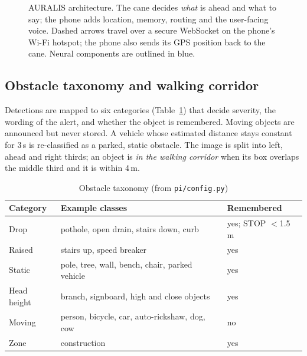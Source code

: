 \documentclass[conference]{IEEEtran}
\begin{document}
\begin{figure}[t]
\caption{AURALIS architecture. The cane decides \emph{what} is ahead and what to say; the phone adds location, memory, routing and the user-facing voice. Dashed arrows travel over a secure WebSocket on the phone's Wi-Fi hotspot; the phone also sends its GPS position back to the cane. Neural components are outlined in blue.}
\label{fig:arch}
\end{figure}

\subsection{Obstacle taxonomy and walking corridor}
Detections are mapped to six categories (Table~\ref{tab:taxonomy}) that decide severity, the wording of the alert, and whether the object is remembered. Moving objects are announced but never stored. A vehicle whose estimated distance stays constant for 3\,s is re-classified as a parked, static obstacle. The image is split into left, ahead and right thirds; an object is \emph{in the walking corridor} when its box overlaps the middle third and it is within 4\,m.

\begin{table}[t]
\caption{Obstacle taxonomy (from \texttt{pi/config.py})}
\label{tab:taxonomy}
\centering\footnotesize
\begin{tabular}{@{}lp{36mm}p{19mm}@{}}
\toprule
Category & Example classes & Remembered \\
\midrule
Drop & pothole, open drain, stairs down, curb & yes; STOP $<$1.5\,m \\
Raised & stairs up, speed breaker & yes \\
Static & pole, tree, wall, bench, chair, parked vehicle & yes \\
Head height & branch, signboard, high and close objects & yes \\
Moving & person, bicycle, car, auto-rickshaw, dog, cow & no \\
Zone & construction & yes \\
\bottomrule
\end{tabular}
\end{table}
\end{document}
